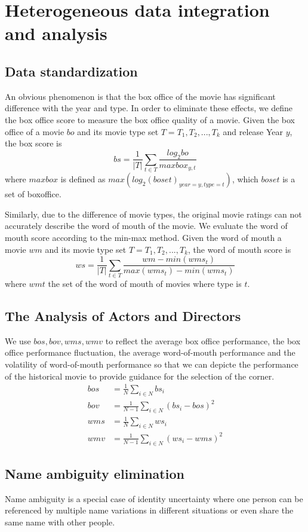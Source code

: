 \section{Heterogeneous data integration and analysis}
\label{sec:analyse}
\subsection{Data standardization}
An obvious phenomenon is that the box office of the movie has significant difference with the year and type. In order to eliminate these effects, we define the box office score to measure the box office quality of a movie. Given the box office of a movie $bo$ and its movie type set $T = {T_1,T_2,...,T_k}$ and release Year $y$, the box score is 
\begin{equation}
bs=\frac{1}{|T|}\sum_{t\in T}\frac{log_2bo}{maxbox_{y,t}}
\end{equation}
where $maxbox$ is defined as $max(log_2(boset)_{year=y,type=t})$, which $boset$ is a set of boxoffice.\\
\par Similarly, due to the difference of movie types, the original movie ratings can not accurately describe the word of mouth of the movie. We evaluate the word of mouth score according to the min-max method. Given the word of mouth a movie $wm$ and its movie type set $T = {T_1,T_2,...,T_k}$, the word of mouth score is 
\begin{equation}
ws=\frac{1}{|T|}\sum_{t\in T}\frac{wm-min(wms_t)}{max(wms_t)-min(wms_t)}
\end{equation}
where $wmt$ the set of the word of mouth of movies where type is $t$.
\subsection{The Analysis of Actors and Directors}
We use $bos,bov,wms,wmv$ to reflect the average box office performance, the box office performance fluctuation, the average word-of-mouth performance and the volatility of word-of-mouth performance so that we can depicte the performance of the historical movie to provide guidance for the selection of the corner.
\begin{subequations}
\begin{align}
bos &=  \frac{1}{N}\sum_{i\in N}bs_i\\
bov &= \frac{1}{N-1}\sum_{i\in N}(bs_i-bos)^2\\
wms &=  \frac{1}{N}\sum_{i\in N}ws_i\\
wmv &= \frac{1}{N-1}\sum_{i\in N}(ws_i-wms)^2
\end{align}
\end{subequations}
\subsection{Name ambiguity elimination}
Name ambiguity is a special case of identity uncertainty where one person can be referenced by multiple name variations in different situations or even share the same name with other people.


